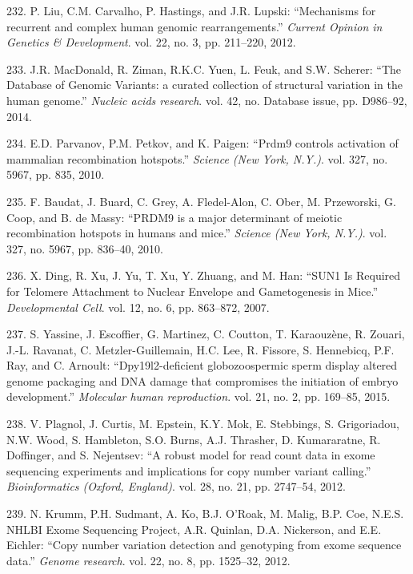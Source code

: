 \documentclass[12pt,a4paper,twoside]{ugathesis}
\theoremstyle{definition}
\theoremstyle{definition}
\theoremstyle{definition}
\theoremstyle{remark}
\begin{document}
\hypertarget{ref-Liu2012}{}
232. P. Liu, C.M. Carvalho, P. Hastings, and J.R. Lupski: ``Mechanisms
for recurrent and complex human genomic rearrangements.'' \emph{Current
Opinion in Genetics \& Development}. vol. 22, no. 3, pp. 211--220, 2012.

\hypertarget{ref-MacDonald2014}{}
233. J.R. MacDonald, R. Ziman, R.K.C. Yuen, L. Feuk, and S.W. Scherer:
``The Database of Genomic Variants: a curated collection of structural
variation in the human genome.'' \emph{Nucleic acids research}. vol. 42,
no. Database issue, pp. D986--92, 2014.

\hypertarget{ref-Parvanov2010}{}
234. E.D. Parvanov, P.M. Petkov, and K. Paigen: ``Prdm9 controls
activation of mammalian recombination hotspots.'' \emph{Science (New
York, N.Y.)}. vol. 327, no. 5967, pp. 835, 2010.

\hypertarget{ref-Baudat2010}{}
235. F. Baudat, J. Buard, C. Grey, A. Fledel-Alon, C. Ober, M.
Przeworski, G. Coop, and B. de Massy: ``PRDM9 is a major determinant of
meiotic recombination hotspots in humans and mice.'' \emph{Science (New
York, N.Y.)}. vol. 327, no. 5967, pp. 836--40, 2010.

\hypertarget{ref-Ding2007}{}
236. X. Ding, R. Xu, J. Yu, T. Xu, Y. Zhuang, and M. Han: ``SUN1 Is
Required for Telomere Attachment to Nuclear Envelope and Gametogenesis
in Mice.'' \emph{Developmental Cell}. vol. 12, no. 6, pp. 863--872,
2007.

\hypertarget{ref-Yassine2015a}{}
237. S. Yassine, J. Escoffier, G. Martinez, C. Coutton, T. Karaouzène,
R. Zouari, J.-L. Ravanat, C. Metzler-Guillemain, H.C. Lee, R. Fissore,
S. Hennebicq, P.F. Ray, and C. Arnoult: ``Dpy19l2-deficient
globozoospermic sperm display altered genome packaging and DNA damage
that compromises the initiation of embryo development.'' \emph{Molecular
human reproduction}. vol. 21, no. 2, pp. 169--85, 2015.

\hypertarget{ref-Plagnol2012}{}
238. V. Plagnol, J. Curtis, M. Epstein, K.Y. Mok, E. Stebbings, S.
Grigoriadou, N.W. Wood, S. Hambleton, S.O. Burns, A.J. Thrasher, D.
Kumararatne, R. Doffinger, and S. Nejentsev: ``A robust model for read
count data in exome sequencing experiments and implications for copy
number variant calling.'' \emph{Bioinformatics (Oxford, England)}. vol.
28, no. 21, pp. 2747--54, 2012.

\hypertarget{ref-Krumm2012}{}
239. N. Krumm, P.H. Sudmant, A. Ko, B.J. O'Roak, M. Malig, B.P. Coe,
N.E.S. NHLBI Exome Sequencing Project, A.R. Quinlan, D.A. Nickerson, and
E.E. Eichler: ``Copy number variation detection and genotyping from
exome sequence data.'' \emph{Genome research}. vol. 22, no. 8, pp.
1525--32, 2012.
\end{document}
